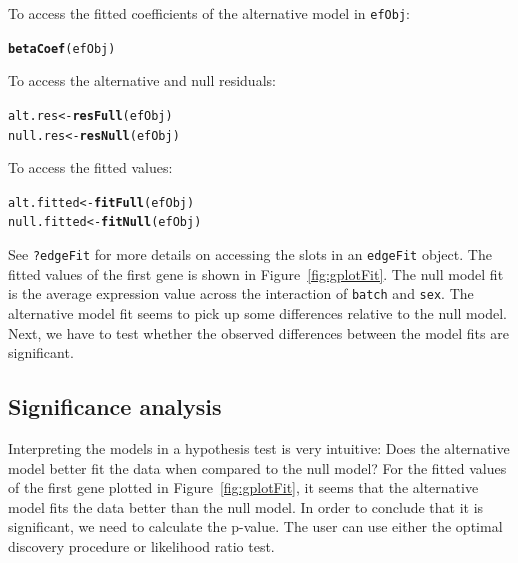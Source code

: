 \documentclass{article}\usepackage[]{graphicx}\usepackage[]{color}
\makeatletter
\newcommand{\hlstd}[1]{\textcolor[rgb]{0.345,0.345,0.345}{#1}}%
\newcommand{\hlkwb}[1]{\textcolor[rgb]{0.69,0.353,0.396}{#1}}%
\newcommand{\hlkwd}[1]{\textcolor[rgb]{0.737,0.353,0.396}{\textbf{#1}}}%
\newenvironment{kframe}{%
 \def\at@end@of@kframe{}%
 \ifinner\ifhmode%
  \def\at@end@of@kframe{\end{minipage}}%
  \begin{minipage}{\columnwidth}%
 \fi\fi%
 \def\FrameCommand##1{\hskip\@totalleftmargin \hskip-\fboxsep
 \colorbox{shadecolor}{##1}\hskip-\fboxsep
     \hskip-\linewidth \hskip-\@totalleftmargin \hskip\columnwidth}%
 \MakeFramed {\advance\hsize-\width
   \@totalleftmargin\z@ \linewidth\hsize
   \@setminipage}}%
 {\par\unskip\endMakeFramed%
 \at@end@of@kframe}
\newenvironment{knitrout}{}{} %
\makeatother
\begin{document}
To access the fitted coefficients of the alternative model in {\tt efObj}:
\begin{knitrout}
\color{fgcolor}\begin{kframe}
\begin{alltt}
\hlkwd{betaCoef}\hlstd{(efObj)}
\end{alltt}
\end{kframe}
\end{knitrout}
To access the alternative and null residuals:
\begin{knitrout}
\color{fgcolor}\begin{kframe}
\begin{alltt}
\hlstd{alt.res} \hlkwb{<-} \hlkwd{resFull}\hlstd{(efObj)}
\hlstd{null.res} \hlkwb{<-} \hlkwd{resNull}\hlstd{(efObj)}
\end{alltt}
\end{kframe}
\end{knitrout}
To access the fitted values:
\begin{knitrout}
\color{fgcolor}\begin{kframe}
\begin{alltt}
\hlstd{alt.fitted} \hlkwb{<-} \hlkwd{fitFull}\hlstd{(efObj)}
\hlstd{null.fitted} \hlkwb{<-} \hlkwd{fitNull}\hlstd{(efObj)}
\end{alltt}
\end{kframe}
\end{knitrout}

See {\tt ?edgeFit} for more details on accessing the slots in an {\tt edgeFit} object. The fitted values of the first gene is shown in Figure~\ref{fig:gplotFit}. The null model fit is the average expression value across the interaction of {\tt batch} and {\tt sex}. The alternative model fit seems to pick up some differences relative to the null model. Next, we have to test whether the observed differences between the model fits are significant.

\subsection{Significance analysis}
Interpreting the models in a hypothesis test is very intuitive: Does the alternative model better fit the data when compared to the null model? For the fitted values of the first gene plotted in Figure~\ref{fig:gplotFit}, it seems that the alternative model fits the data better than the null model. In order to conclude that it is significant, we need to calculate the p-value. The user can use either the optimal discovery procedure or likelihood ratio test. 
\end{document}
